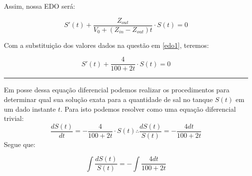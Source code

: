 \documentclass[11pt]{article}
\begin{document}
Assim, nossa EDO será:

\begin{equation}
    \label{edo1}
    S'(t) + \frac{Z_{out}}{V_{0} + (Z_{in} - Z_{out})t} \cdot S(t) = 0
\end{equation}

Com a substituição dos valores dados na questão em \eqref{edo1},
teremos:

\begin{equation}
    \label{edo_com_valores}
    S'(t) + \frac{4}{100+2t} \cdot S(t) = 0
\end{equation}

\begin{center}\rule{0.5\linewidth}{\linethickness}\end{center}

Em posse dessa equação diferencial podemos realizar os procedimentos
para determinar qual sua solução exata para a quantidade de sal no
tanque \(S(t)\) em um dado instante \(t\). Para isto podemos resolver
como uma equação diferencial trivial: \begin{equation*}
    \frac{dS(t)}{dt} = - \frac{4}{100+2t} \cdot S(t) \therefore \frac{dS(t)}{S(t)} = - \frac{4dt}{100+2t}
\end{equation*} Segue que:

\begin{equation*}
    \int{\frac{dS(t)}{S(t)}} = - \int{\frac{4dt}{100+2t}}
\end{equation*}
\end{document}

